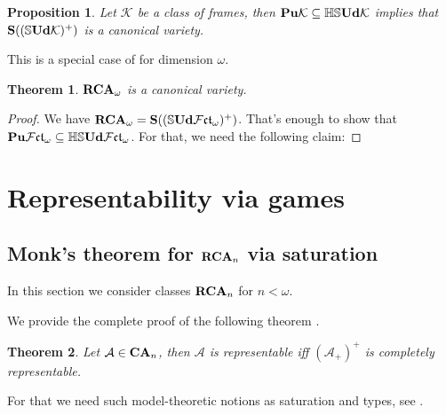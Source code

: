 \documentclass{article}
\theoremstyle{defin}
\theoremstyle{theorem}
\newtheorem{theorem}{Theorem}
\theoremstyle{claim}
\theoremstyle{prop}
\newtheorem{prop}{Proposition}
\theoremstyle{lemma}
\theoremstyle{fact}
\theoremstyle{remark}
\theoremstyle{ex}
\theoremstyle{col}
\theoremstyle{question}
\begin{document}
\begin{prop}
Let $\mathcal{K}$ be a class of frames, then ${\bf Pu}\mathcal{K} \subseteq \mathbb{H}\mathbb{S}{\bf Ud} \mathcal{K}$ implies that ${\bf S}((\mathbb{S}{\bf Ud} \mathcal{K})^+)$ is a canonical variety.
\end{prop}

This is a special case of \cite[Theorem 4.4]{goldblatt1995elementary} for dimension $\omega$.

\begin{theorem}
${\bf RCA}_{\omega}$ is a canonical variety.
\end{theorem}

\begin{proof}
We have ${\bf RCA}_{\omega} = {\bf S}((\mathbb{S} {\bf Ud} \mathcal{F}\mathfrak{ct}_{\omega})^+)$.
That's enough to show that ${\bf Pu} \mathcal{F}\mathfrak{ct}_{\omega} \subseteq \mathbb{HS} {\bf Ud} \mathcal{F}\mathfrak{ct}_{\omega}$.
For that, we need the following claim:

\end{proof}

\section{Representability via games}

\subsection{Monk's theorem for ${\bf RCA}_n$ via saturation}

In this section we consider classes ${\bf RCA}_n$ for $n < \omega$.

We provide the complete proof of the following theorem \cite[Theorem 3.4.3]{hirsch2013completions}.
\begin{theorem}\label{finitecanon}
Let $\mathcal{A} \in {\bf CA}_n$, then $\mathcal{A}$ is representable iff $(\mathcal{A}_+)^{+}$ is completely representable.
\end{theorem}

For that we need such model-theoretic notions as saturation and types, see \cite[Section 6.3]{hodges1993model}.
\end{document}
